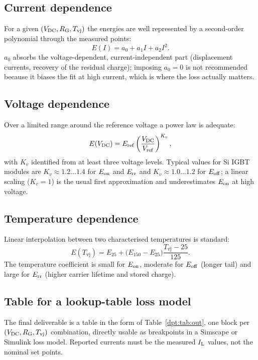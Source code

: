 \subsection{Current dependence}

For a given $(V_{\mathrm{DC}}, R_{\mathrm{G}}, T_{\mathrm{vj}})$ the energies are well represented by
a second-order polynomial through the measured points:
\begin{equation}
E(I) = a_0 + a_1 I + a_2 I^2 .
\end{equation}
$a_0$ absorbs the voltage-dependent, current-independent part (displacement currents,
recovery of the residual charge); imposing $a_0=0$ is not recommended because it biases
the fit at high current, which is where the loss actually matters.

\subsection{Voltage dependence}

Over a limited range around the reference voltage a power law is adequate:
\begin{equation}
E(V_{\mathrm{DC}})=E_{\mathrm{ref}}\left(\frac{V_{\mathrm{DC}}}{V_{\mathrm{ref}}}\right)^{K_v},
\end{equation}
with $K_v$ identified from at least three voltage levels. Typical values for Si IGBT
modules are $K_v\approx1.2\ldots1.4$ for $E_{\mathrm{on}}$ and $E_{\mathrm{rr}}$ and $K_v\approx1.0\ldots1.2$
for $E_{\mathrm{off}}$; a linear scaling ($K_v=1$) is the usual first approximation and
underestimates $E_{\mathrm{on}}$ at high voltage.

\subsection{Temperature dependence}

Linear interpolation between two characterised temperatures is standard:
\begin{equation}
E(T_{\mathrm{vj}})=E_{25}+\big(E_{150}-E_{25}\big)\frac{T_{\mathrm{vj}}-25}{125}.
\end{equation}
The temperature coefficient is small for $E_{\mathrm{on}}$, moderate for $E_{\mathrm{off}}$ (longer tail) and
large for $E_{\mathrm{rr}}$ (higher carrier lifetime and stored charge).

\subsection{Table for a lookup-table loss model}

The final deliverable is a table in the form of Table~\ref{dpt:tab:out}, one block per
$(V_{\mathrm{DC}}, R_{\mathrm{G}}, T_{\mathrm{vj}})$ combination, directly usable as breakpoints in
a Simscape or Simulink loss model. Reported currents must be the measured $I_{\mathrm{L}}$ values,
not the nominal set points.

